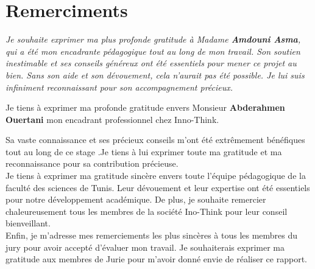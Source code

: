 \chapter*{\huge Remerciments}
\it \Large
Je souhaite exprimer ma plus profonde gratitude à Madame {\textbf{ Amdouni Asma}}, qui a été mon encadrante pédagogique tout au long de mon travail. Son soutien inestimable et ses conseils généreux ont été essentiels pour mener ce projet au bien. Sans son aide et son dévouement, cela n'aurait pas été possible. Je lui suis infiniment reconnaissant pour son accompagnement précieux.



Je tiens à exprimer ma profonde gratitude envers Monsieur {\textbf{Abderahmen Ouertani}} mon encadrant professionnel chez Inno-Think.

Sa vaste connaissance et ses précieux conseils m'ont été extrêmement bénéfiques tout au long de ce stage .Je tiens à lui exprimer toute ma gratitude et ma reconnaissance pour sa contribution précieuse.\\

Je tiens à exprimer ma gratitude sincère envers toute l'équipe pédagogique de la faculté des sciences de Tunis. Leur dévouement et leur expertise ont été essentiels pour notre développement académique. De plus, je souhaite remercier chaleureusement tous les membres de la société Ino-Think pour leur conseil bienveillant.\\

Enfin, je m'adresse mes remerciements les plus sincères à tous les membres du jury pour avoir accepté d'évaluer mon travail.
Je souhaiterais exprimer ma gratitude aux membres de Jurie pour m’avoir donné envie de réaliser ce rapport.
